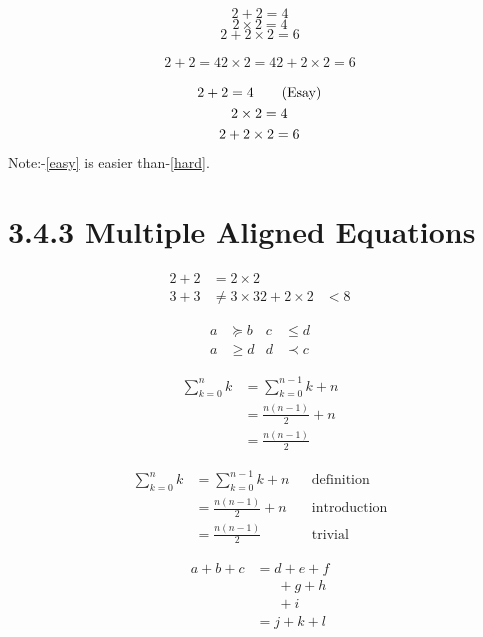 \documentclass{article}
\begin{document}
\begin{equation}
  2 + 2 = 4
\end{equation}
\begin{equation}
  2 \times 2 = 4
\end{equation}
\begin{equation}
  2 + 2 \times 2 = 6
\end{equation}

\begin{gather}
  2 + 2 = 4
  2 \times 2 = 4
  2 + 2 \times 2 = 6
\end{gather}

\begin{gather}
  2 + 2 = 4
    \tag{Esay}\label{easy} \\
  2 \times 2 = 4 \notag \\
  2 + 2 \times 2 = 6
    \label{hard}
\end{gather}
Note:-\eqref{easy} is easier 
than-\eqref{hard}.

\section{3.4.3 Multiple Aligned Equations}

\begin{align}
  2 + 2 & = 2 \times 2 \\
  3 + 3 & \neq 3 \times 3
  2 + 2 \times 2& < 8
\end{align}

\begin{align}
  a & \succeq b & c & \leq d \\
  a & \geq d & d & \prec c
\end{align}

\begin{align}
  \sum_{k=0}^n k 
  &= \sum_{k=0}^{n-1} k + n \\
  &= \frac{n(n-1)}{2}  + n \\
  &= \frac{n(n-1)}{2}
\end{align}

\begin{align}
  \sum_{k=0}^n k 
  &= \sum_{k=0}^{n-1} k + n && \text{definition}\\
  &= \frac{n(n-1)}{2}  + n && \text{introduction}\\
  &= \frac{n(n-1)}{2} && \text{trivial}
\end{align}

\begin{align}
  a + b + c
  &= d + e + f \nonumber \\
  & \phantom{=}\ + g + h \nonumber \\
  & \phantom{=}\ + i \\
  &= j + k + l
\end{align}
\end{document}
